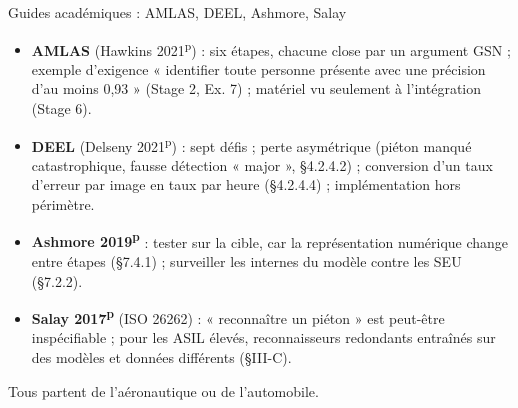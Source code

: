 \documentclass[aspectratio=169,11pt]{beamer}
\newcommand{\pre}{\textsuperscript{\color{acc}p}}
\begin{document}
\begin{frame}{Guides académiques : AMLAS, DEEL, Ashmore, Salay}
  \small
  \begin{itemize}
    \item \textbf{AMLAS} (Hawkins 2021\pre) : six étapes, chacune close par un argument GSN ;
          exemple d'exigence « identifier toute personne présente avec une précision d'au
          moins 0,93 » (Stage 2, Ex. 7) ; matériel vu seulement à l'intégration (Stage 6).
    \item \textbf{DEEL} (Delseny 2021\pre) : sept défis ; perte \alert{asymétrique} (piéton
          manqué catastrophique, fausse détection « major », §4.2.4.2) ; conversion d'un taux
          d'erreur par image en taux par heure (§4.2.4.4) ; implémentation hors périmètre.
    \item \textbf{Ashmore 2019\pre} : tester sur la cible, car la représentation numérique
          change entre étapes (§7.4.1) ; surveiller les internes du modèle contre les SEU
          (§7.2.2).
    \item \textbf{Salay 2017\pre} (ISO 26262) : « reconnaître un piéton » est peut-être
          inspécifiable ; pour les ASIL élevés, reconnaisseurs redondants entraînés sur des
          modèles et données différents (§III-C).
  \end{itemize}

  \vspace{0.3em}
  Tous partent de l'aéronautique ou de l'automobile.
\end{frame}
\end{document}
